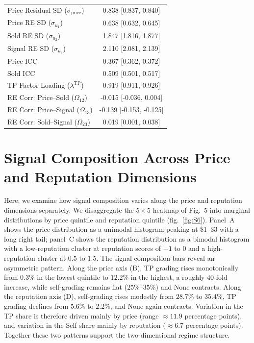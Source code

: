 \documentclass[11pt,letterpaper]{article}
\theoremstyle{definition}
\begin{document}
\begin{table}[H]
\begin{tabular}[t]{lc}
\hspace{1em}Price Residual SD ($\sigma_{\text{price}}$) & 0.838 [0.837, 0.840]\\
\hspace{1em}Price RE SD ($\sigma_{u_1}$) & 0.638 [0.632, 0.645]\\
\hspace{1em}Sold RE SD ($\sigma_{u_2}$) & 1.847 [1.816, 1.877]\\
\hspace{1em}Signal RE SD ($\sigma_{u_3}$) & 2.110 [2.081, 2.139]\\
\hspace{1em}Price ICC & 0.367 [0.362, 0.372]\\
\hspace{1em}Sold ICC & 0.509 [0.501, 0.517]\\
\hspace{1em}TP Factor Loading ($\lambda^{\text{TP}}$) & 0.919 [0.911, 0.926]\\
\hspace{1em}RE Corr: Price--Sold ($\Omega_{12}$) & -0.015 [-0.036, 0.004]\\
\hspace{1em}RE Corr: Price--Signal ($\Omega_{13}$) & -0.139 [-0.153, -0.125]\\
\hspace{1em}RE Corr: Sold--Signal ($\Omega_{23}$) & 0.019 [0.001, 0.038]\\
\bottomrule
\end{tabular}

\end{table}

\clearpage
\section{Signal Composition Across Price and Reputation Dimensions}\label{sec:res-I}

Here, we examine how signal composition varies along the price and reputation dimensions separately. We disaggregate the $5 \times 5$ heatmap of Fig.~5 into marginal distributions by price quintile and reputation quintile (fig.~\ref{fig:S6}). Panel~A shows the price distribution as a unimodal histogram peaking at \$1--\$3 with a long right tail; panel~C shows the reputation distribution as a bimodal histogram with a low-reputation cluster at reputation scores of $-1$ to $0$ and a high-reputation cluster at $0.5$ to $1.5$. The signal-composition bars reveal an asymmetric pattern. Along the price axis (B), TP grading rises monotonically from $0.3\%$ in the lowest quintile to $12.2\%$ in the highest, a roughly 40-fold increase, while self-grading remains flat ($25\%$--$35\%$) and None contracts. Along the reputation axis (D), self-grading rises modestly from $28.7\%$ to $35.4\%$, TP grading declines from $5.6\%$ to $2.2\%$, and None again contracts. Variation in the TP share is therefore driven mainly by price (range $\approx 11.9$ percentage points), and variation in the Self share mainly by reputation ($\approx 6.7$ percentage points). Together these two patterns support the two-dimensional regime structure.
\end{document}

